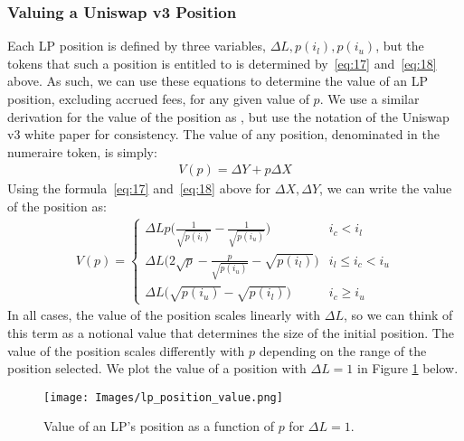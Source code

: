 \documentclass[11pt]{article}
\begin{document}
\subsubsection{Valuing a Uniswap v3 Position}

Each LP position is defined by three variables, $\Delta L, p(i_l), p(i_u)$, but the tokens that such a position is entitled to is determined by~\eqref{eq:17}  and~\eqref{eq:18} above. As such, we can use these equations to determine the value of an LP position, excluding accrued fees, for any given value of $p$. We use a similar derivation for the value of the position as \citep{LambertMedium1}, but use the notation of the Uniswap v3 white paper for consistency. The value of any position, denominated in the numeraire token, is simply:
\begin{gather*}
    V(p) = \Delta Y + p \Delta X
\end{gather*}
Using the formula~\eqref{eq:17} and~\eqref{eq:18} above for $\Delta X, \Delta Y$, we can write the value of the position as:
\begin{gather}
    V(p) =
    \begin{cases}
        \Delta L p \bigg( \frac{1}{\sqrt{p(i_l)}} - \frac{1}{\sqrt{p(i_u)}} \bigg) & i_c < i_l \\
        \Delta L \bigg( 2 \sqrt{p} - \frac{p}{\sqrt{p(i_u)}} - \sqrt{p(i_l)} \bigg) & i_l \le i_c < i_u \\
        \Delta L \big( \sqrt{p(i_u)} - \sqrt{p(i_l)} \big) & i_c \ge i_u
    \end{cases} \label{eq:19}
\end{gather}
In all cases, the value of the position scales linearly with $\Delta L$, so we can think of this term as a notional value that determines the size of the initial position. The value of the position scales differently with $p$ depending on the range of the position selected. We plot the value of a position with $\Delta L = 1$ in Figure \ref{fig:lp_position_value} below.
\begin{figure}[H]
    \centering
    \texttt{[image: Images/lp\_position\_value.png]}
    \caption{Value of an LP's position as a function of $p$ for $\Delta L = 1$.}
    \label{fig:lp_position_value}
\end{figure}
\end{document}
